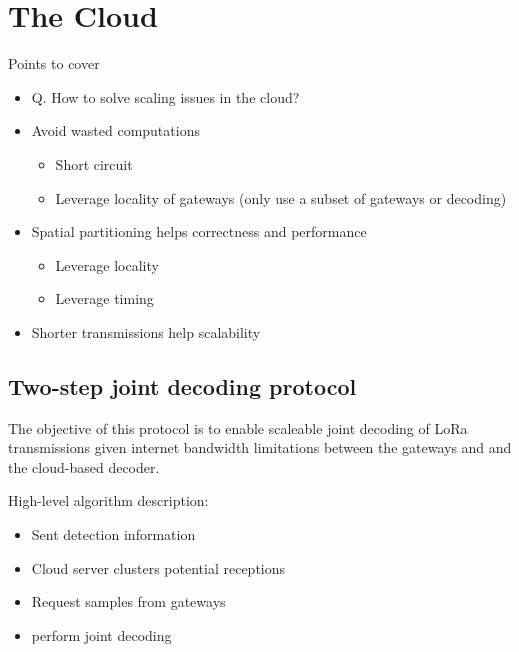 \section{The Cloud}
\label{sec:cloud}

{\color{blue}
Points to cover
\begin{itemize} 
    \item Q. How to solve scaling issues in the cloud?
    \item Avoid wasted computations
        \begin{itemize}
            \item Short circuit
            \item Leverage locality of gateways (only use a subset of gateways  or decoding)
        \end{itemize}
    \item Spatial partitioning helps correctness and performance
        \begin{itemize}
            \item Leverage locality
            \item Leverage timing
        \end{itemize}
    \item Shorter transmissions help scalability
\end{itemize}
}

\subsection{Two-step joint decoding protocol}

The objective of this protocol is to enable scaleable joint decoding of LoRa transmissions given internet bandwidth limitations between the gateways and and the cloud-based decoder.

{\color{blue} High-level algorithm description:
\begin{itemize}
    \item Sent detection information
    \item Cloud server clusters potential receptions
    \item Request samples from gateways
    \item perform joint decoding
\end{itemize}
}